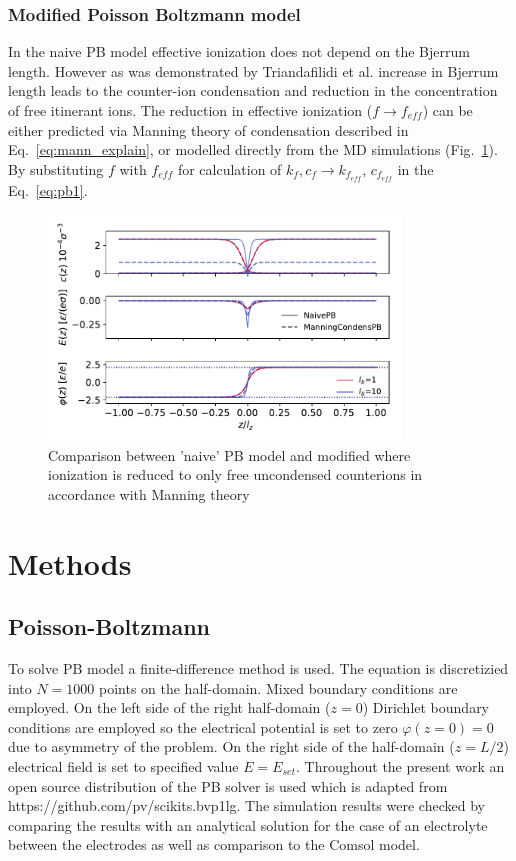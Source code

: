 \documentclass[twoside,twocolumn,9pt]{article}
\begin{document}
\subsubsection{Modified Poisson Boltzmann model}

In the naive PB model effective ionization does not depend on the Bjerrum length. However as was demonstrated by Triandafilidi et al. \citep{Erbas2015,Triandafilidi2018MolecularEffect} increase in Bjerrum length leads to the counter-ion condensation and reduction in the concentration of free itinerant ions. The reduction in effective ionization ($f \to f_{eff}$) can be either predicted via Manning theory of condensation described in Eq.~\ref{eq:mann_explain}, or modelled directly from the MD simulations (Fig.~\ref{fig:condensation}). By substituting $f$ with $f_{eff}$ for calculation of $k_f, c_f \to k_{f_{eff}}$, $c_{f_{eff}}$  in the Eq.~\ref{eq:pb1}.   


\begin{figure}[h]
\centering
  \includegraphics[height=6cm]{fig/BVP_compare.pdf}
  \caption{Comparison between 'naive' PB model and modified where ionization is reduced to only free uncondensed counterions in accordance with Manning theory}
  \label{fig:condensation}
\end{figure}

\section{Methods}
\label{methods}

\subsection{Poisson-Boltzmann}

To solve PB model a finite-difference method is used. The equation is discretizied into $N=1000$ points on the half-domain. Mixed boundary conditions are employed. On the left side of the right half-domain ($z=0$) Dirichlet boundary conditions are employed so the electrical potential is  set to zero $\varphi(z=0) = 0$ due to asymmetry of the problem. On the right side of the half-domain ($z=L/2$) electrical field is set to specified value $E = E_{set}$. Throughout the present work an open source distribution of the PB solver is used which is adapted from https://github.com/pv/scikits.bvp1lg. The simulation results were checked by comparing the results with an analytical solution for the case of an electrolyte between the electrodes as well as comparison to the Comsol model.
\end{document}
